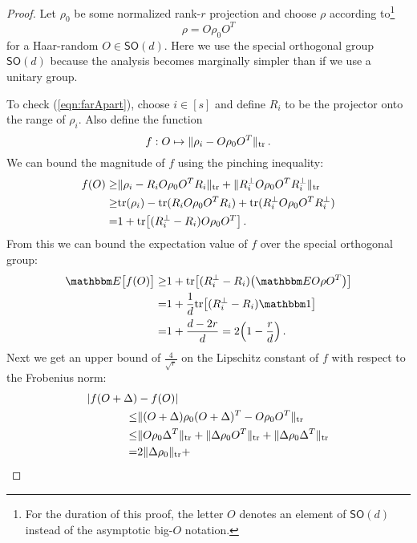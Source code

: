 \begin{proof}
	Let $\rho_0$ be some normalized rank-$r$ projection and choose
	$\rho$ according to\footnote{For the duration of this proof, the letter $O$ denotes an element of $\mathsf{SO}(d)$ instead of the asymptotic big-$O$ notation.}  
	\begin{equation*}
		\rho = O \rho_0 O^T
	\end{equation*}
	for a Haar-random $O\in \textsf{SO}(d)$. Here we use the special orthogonal group $\textsf{SO}(d)$ because the analysis becomes marginally simpler than if we use a unitary group. 

	To check (\ref{eqn:farApart}), choose $i \in [s]$ and define
	$R_i$ to be the projector onto the range of $\rho_i$. Also define the function 
	\begin{equation*}
		f: O \mapsto \|\rho_i - O \rho_0 O^T \|_{\mathrm{tr}}\,.
	\end{equation*}
	We can bound the magnitude of $f$ using the pinching inequality:
	\begin{align*}
		f(O) \geq& \|\rho_i - R_i O \rho_0 O^T R_i\|_{\mathrm{tr}} + \|R_i^\perp O  \rho_0 O^T R_i^\perp\|_{\mathrm{tr}} \\
           \geq& \mathrm{tr}(\rho_i) -\mathrm{tr}(R_i O \rho_0 O^T R_i) + \mathrm{tr}(R_i^\perp O  \rho_0 O^T R_i^\perp) \\
		 =& 1  +\mathrm{tr}\bigl[(R_i^\perp - R_i)O \rho_0 O^T\bigr] \,.
	\end{align*}
	From this we can bound the expectation value of $f$ over the special orthogonal group:
	\begin{align*}
		\EE\bigl[f(O)\bigr]
		\geq& 1+ \tr\bigl[(R_i^\perp - R_i) \big( \EE O \rho O^T \big)\bigr]  \\
		=& 1+ \frac{1}{d} \tr\bigl[(R_i^\perp - R_i) \Id\bigr] \\
		=& 1 + \frac{d-2r}{d}=2\Bigl(1-\frac{r}{d}\Bigr)\,.
	\end{align*}
	Next we get an upper bound of $\frac{4}{\sqrt{r}}$ on the Lipschitz constant of $f$ with respect to the Frobenius norm:
	\begin{align*}
	\begin{split}
		|f(O+\Delta) & - f(O)| \\
		\leq& 
		\|(O+\Delta) \rho_0 (O+\Delta)^T - O \rho_0 O^T\|_{\tr} \\
		\leq& 
		\|O \rho_0 \Delta^T\|_{\tr} + \|\Delta\rho_0
		O^T\|_{\tr} + \|\Delta \rho_0 \Delta^T\|_{\tr} \\
		=& 
		2\|\Delta \rho_0\|_{\tr}  +

\end{split}
\end{align*}
\end{proof}

